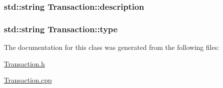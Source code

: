\subsubsection[{\texorpdfstring{description}{description}}]{\setlength{\rightskip}{0pt plus 5cm}std\+::string Transaction\+::description\hspace{0.3cm}{\ttfamily [private]}}\hypertarget{classTransaction_aae986091e9d65be398575a4699a8f1ac}{}\label{classTransaction_aae986091e9d65be398575a4699a8f1ac}
\subsubsection[{\texorpdfstring{type}{type}}]{\setlength{\rightskip}{0pt plus 5cm}std\+::string Transaction\+::type\hspace{0.3cm}{\ttfamily [private]}}\hypertarget{classTransaction_a0c0b931f105f8e7d2fe9865f75a4be9c}{}\label{classTransaction_a0c0b931f105f8e7d2fe9865f75a4be9c}


The documentation for this class was generated from the following files\+:\begin{DoxyCompactItemize}
\item 
\hyperlink{Transaction_8h}{Transaction.\+h}\item 
\hyperlink{Transaction_8cpp}{Transaction.\+cpp}\end{DoxyCompactItemize}
